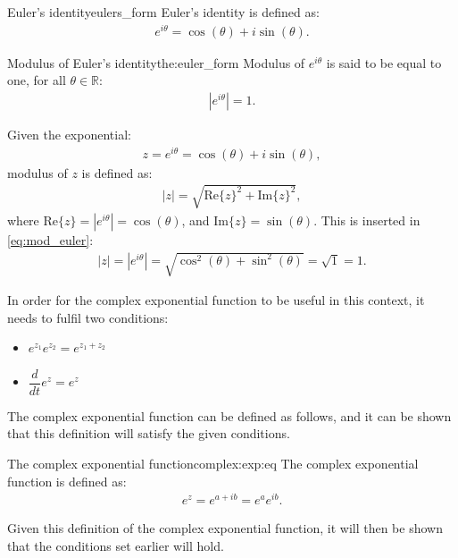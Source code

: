 \begin{definition}{Euler's identity}{eulers_form}
Euler's identity is defined as: \cite[p. 231]{diffandcomplex}
\begin{align}
e^{i\theta}=\cos(\theta)+ i \sin(\theta).
\end{align} 
\end{definition}
\begin{theorem}{Modulus of Euler's identity}{the:euler_form}
Modulus of $e^{i\theta}$ is said to be equal to one, for all $\theta \in \mathbb{R}$:
\begin{align*}
|e^{i\theta}|=1.
\end{align*}
\end{theorem}
\begin{prof}{}{}
Given the exponential:
\begin{align*}
z=e^{i\theta}=\cos(\theta)+i\sin(\theta),
\end{align*}
modulus of $z$ is defined as:
\begin{align}
|z|=\sqrt{\text{Re}\{z\}^2+\text{Im}\{z\}^2}, \label{eq:mod_euler}
\end{align}
where $\text{Re}\{z\}=|e^{i\theta}|=\cos(\theta)$, and $\text{Im}\{z\}=\sin(\theta)$. This is inserted in \eqref{eq:mod_euler}:
\begin{align*}
|z|=|e^{i\theta}|=\sqrt{\cos^2(\theta)+\sin^2(\theta)}=\sqrt{1}=1.
\end{align*}
\end{prof}
\noindent In order for the complex exponential function to be useful in this context, it needs to fulfil two conditions:
\begin{itemize}
	\item $e^{z_1}e^{z_2} = e^{z_1 + z_2}$
	\item $\dfrac{d}{dt}e^{z} = e^{z}$
\end{itemize}
The complex exponential function can be defined as follows, and it can be shown that this definition will satisfy the given conditions.

\begin{definition}{The complex exponential function}{complex:exp:eq}
The complex exponential function is defined as:
\begin{align*}
	e^{z}=e^{a+ib}=e^{a}e^{ib}.
\end{align*}
\end{definition}

\noindent
Given this definition of the complex exponential function, it will then be shown that the conditions set earlier will hold.\\

